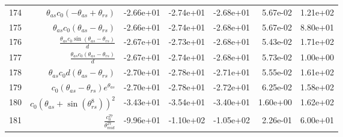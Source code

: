 \begin{tabularx}{\textwidth}{lRRRRRl}
174  &  $ \theta_{as} c_{0} \left(- \theta_{as} + \theta_{rs}\right) $  &  -2.66e+01  &  -2.74e+01  &  -2.68e+01  &  5.67e-02  &  1.21e+02  \\ 
175  &  $ \theta_{as} c_{0} \left(\theta_{as} - \theta_{rs}\right) $  &  -2.66e+01  &  -2.74e+01  &  -2.68e+01  &  5.67e-02  &  8.80e+01  \\ 
176  &  $ \displaystyle\frac{\theta_{as} c_{0} \sin{\left(\theta_{as} - \theta_{rs} \right)}}{d} $  &  -2.67e+01  &  -2.73e+01  &  -2.68e+01  &  5.43e-02  &  1.71e+02  \\ 
177  &  $ \displaystyle\frac{\theta_{as} c_{0} \left(\theta_{as} - \theta_{rs}\right)}{d} $  &  -2.67e+01  &  -2.74e+01  &  -2.68e+01  &  5.73e-02  &  1.00e+00  \\ 
178  &  $ \theta_{as} c_{0} d \left(\theta_{as} - \theta_{rs}\right) $  &  -2.70e+01  &  -2.78e+01  &  -2.71e+01  &  5.55e-02  &  1.61e+02  \\ 
179  &  $ c_{0} \left(\theta_{as} - \theta_{rs}\right) e^{\theta_{as}} $  &  -2.70e+01  &  -2.78e+01  &  -2.72e+01  &  6.25e-02  &  1.58e+02  \\ 
180  &  $ c_{0} \left(\theta_{as} + \sin{\left(\theta_{rs}^{8} \right)}\right)^{2} $  &  -3.43e+01  &  -3.54e+01  &  -3.40e+01  &  1.60e+00  &  1.62e+02  \\ 
181  &  $ \displaystyle\frac{c_{0}^{27}}{\theta_{mid}^{27}} $  &  -9.96e+01  &  -1.10e+02  &  -1.05e+02  &  2.26e-01  &  6.00e+01  \\ 
\bottomrule
\end{tabularx}
